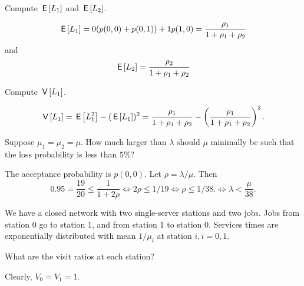 \begin{exercise}[201704]
 Compute $\,\mathsf{E}\left[L_1\right]$ and $\,\mathsf{E}\left[L_2\right]$.
\begin{solution}
 \begin{equation*}
 \,\mathsf{E}\left[L_1\right] = 0 (p(0,0) + p(0,1)) + 1 p(1,0) = \frac{\rho_1}{1+\rho_1 + \rho_2}
 \end{equation*}
and
 \begin{equation*}
 \,\mathsf{E}\left[L_2\right] = \frac{\rho_2}{1+\rho_1 + \rho_2}
 \end{equation*}
\end{solution}
\end{exercise}

\begin{exercise}[201704]
 Compute $\,\mathsf{V}\left[L_1\right]$.
\begin{solution}
 \begin{equation*}
 \,\mathsf{V}\left[L_1\right] = \,\mathsf{E}\left[L_1^2\right] - (\,\mathsf{E}\left[L_1\right])^2= \frac{\rho_1}{1+\rho_1 + \rho_2} - \left(\frac{\rho_1}{1+\rho_1 + \rho_2}\right)^2.
 \end{equation*}
\end{solution}
\end{exercise}

\begin{exercise}[201704]
 Suppose $\mu_1=\mu_2=\mu$. How much larger than $\lambda$ should
 $\mu$ minimally be such that the loss probability is less than
 $5\%$?
\begin{solution}
 The acceptance probability is $p(0,0)$. Let $\rho=\lambda/\mu$. Then
 \begin{equation*}
 0.95 =\frac{19}{20}\leq \frac1{1+2\rho} \iff 2\rho \leq 1/19 \iff \rho \leq 1/38.
 \iff \lambda < \frac{\mu}{38}.
\end{equation*}
\end{solution}
\end{exercise}


We have a closed network with two single-server stations and two jobs. Jobs from station 0 go to station 1, and from station 1 to station 0. Services times are exponentially distributed with mean $1/\mu_i$ at station $i, i=0,1$.

\begin{exercise}[201704]
What are the visit ratios at each station?
\begin{solution}
 Clearly, $V_0=V_1=1$.
\end{solution}
\end{exercise}

